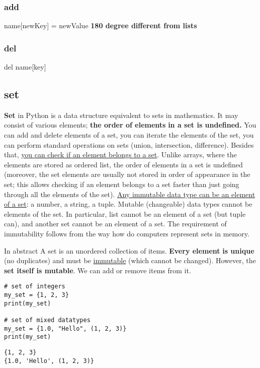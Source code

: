 \documentclass[11pt]{article}
\begin{document}
\subsubsection{add}
\label{sec:orgaabe791}
name[newKey] = newValue
\textbf{180 degree different from lists}

\subsubsection{del}
\label{sec:org750b1c8}
del name[key]

\subsection{set}
\label{sec:org177e78b}
\textbf{Set} in Python is a data structure equivalent to sets in
mathematics. It may consist of various elements; \textbf{the order of elements}
\textbf{in a set is undefined.} You can add and delete elements of a set, you
can iterate the elements of the set, you can perform standard
operations on sets (union, intersection, difference). Besides that,
\uline{you can check if an element belongs to a set}. Unlike arrays, where the
elements are stored as ordered list, the order of elements in a set is
undefined (moreover, the set elements are usually not stored in order
of appearance in the set; this allows checking if an element belongs
to a set faster than just going through all the elements of the
set). \uline{Any immutable data type can be an element of a set}: a number, a
string, a tuple. Mutable (changeable) data types cannot be elements of
the set. In particular, list cannot be an element of a set (but tuple
can), and another set cannot be an element of a set. The requirement
of immutability follows from the way how do computers represent sets
in memory.

In abstract A set is an unordered collection of items. \textbf{Every element}
\textbf{is unique} (no duplicates) and must be \uline{immutable} (which cannot be
changed). However, the \textbf{set itself is mutable}. We can add or remove
items from it.

\begin{verbatim}
# set of integers
my_set = {1, 2, 3}
print(my_set)

# set of mixed datatypes
my_set = {1.0, "Hello", (1, 2, 3)}
print(my_set)
\end{verbatim}

\begin{verbatim}
{1, 2, 3}
{1.0, 'Hello', (1, 2, 3)}
\end{verbatim}
\end{document}
